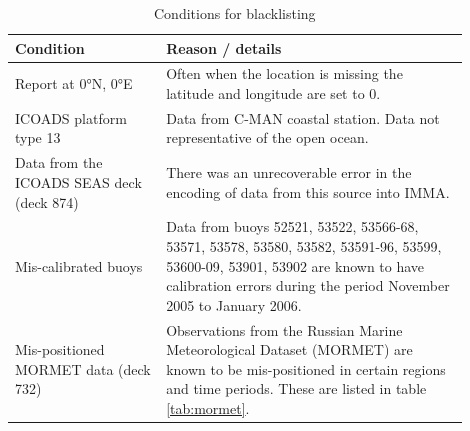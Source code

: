 \begin{table}
\centering
\caption{Conditions for blacklisting}
\label{tab:blacklist}
\begin{tabular}{|p{0.3\linewidth}|p{0.6\linewidth}|}
\hline
\bfseries Condition & \bfseries Reason / details \\
\hline
Report at 0°N, 0°E & Often when the location is missing the latitude and longitude are set to 0.\\\hline
ICOADS platform type 13 & Data from C-MAN coastal station. Data not representative of the open ocean.\\\hline
Data from the ICOADS SEAS deck (deck 874)& There was an unrecoverable error in the encoding of data from this source into IMMA.\\\hline
Mis-calibrated buoys & Data from buoys 52521, 53522, 53566-68, 53571, 53578, 53580, 53582, 53591-96, 53599, 53600-09, 53901, 53902 are known to have calibration errors during the period November 2005 to January 2006.\\\hline
Mis-positioned MORMET data (deck 732) & Observations from the Russian Marine Meteorological Dataset (MORMET) are known to be mis-positioned in certain regions and time periods. These are listed in table \ref{tab:mormet}.\\\hline
\end{tabular}
\end{table}

